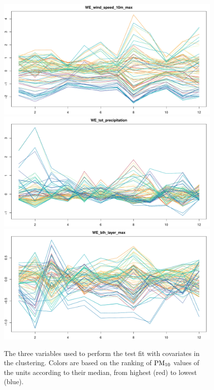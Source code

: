 \documentclass[12pt,	%
	a4paper,		%
	twoside,		%
	openright,		%
	titlepage,%
	]{book}
\theoremstyle{definition}
\begin{document}
\begin{itemize}
\begin{figure}[!p]
    \centering
    \includegraphics[width=1\linewidth]{Testing/Covariates/in clustering/covariate usate/WE_wind_speed_10m_max.pdf}
    \includegraphics[width=1\linewidth]{Testing/Covariates/in clustering/covariate usate/WE_tot_precipitation.pdf}
    \includegraphics[width=1\linewidth]{Testing/Covariates/in clustering/covariate usate/WE_blh_layer_max.pdf}
    \caption[Variables used for the fit tests with covariates in the clustering]{The three variables used to perform the test fit with covariates in the clustering. Colors are based on the ranking of $\text{PM}_{10}$ values of the units according to their median, from highest (red) to lowest (blue).}
    \label{fig: covariate usate nel fit con covariate cl}
\end{figure}
    

\end{itemize}
\end{document}
